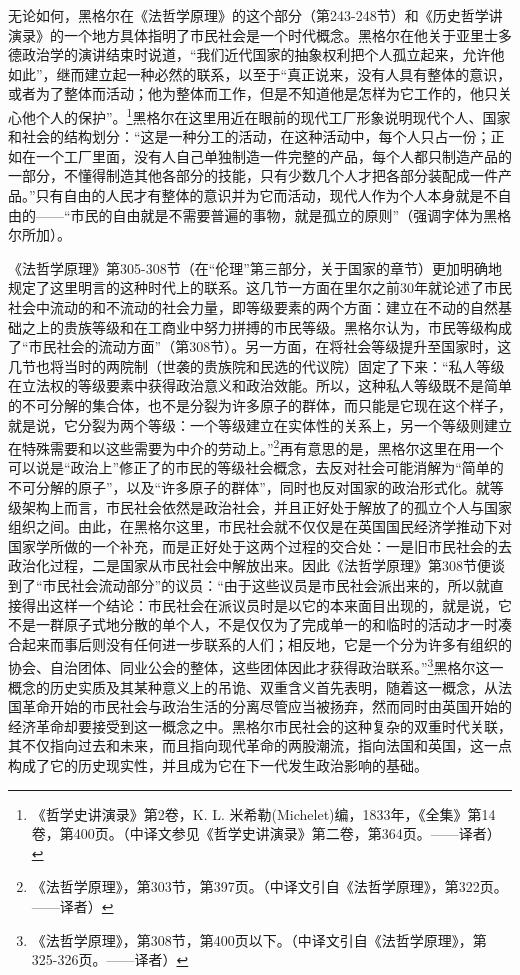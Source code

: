 无论如何，黑格尔在《法哲学原理》的这个部分（第243-248节）和《历史哲学讲演录》的一个地方具体指明了市民社会是一个时代概念。黑格尔在他关于亚里士多德政治学的演讲结束时说道，“我们近代国家的抽象权利把个人孤立起来，允许他如此”，继而建立起一种必然的联系，以至于“真正说来，没有人具有整体的意识，或者为了整体而活动；他为整体而工作，但是不知道他是怎样为它工作的，他只关心他个人的保护”。\footnote{《哲学史讲演录》第2卷，K. L. 米希勒(Michelet)编，1833年，《全集》第14卷，第400页。（中译文参见《哲学史讲演录》第二卷，第364页。——译者）}黑格尔在这里用近在眼前的现代工厂形象说明现代个人、国家和社会的结构划分：“这是一种分工的活动，在这种活动中，每个人只占一份；正如在一个工厂里面，没有人自己单独制造一件完整的产品，每个人都只制造产品的一部分，不懂得制造其他各部分的技能，只有少数几个人才把各部分装配成一件产品。”只有自由的人民才有整体的意识并为它而活动，现代人作为个人本身就是不自由的——“市民的自由就是不需要普遍的事物，就是孤立的原则”（强调字体为黑格尔所加）。

《法哲学原理》第305-308节（在“伦理”第三部分，关于国家的章节）更加明确地规定了这里明言的这种时代上的联系。这几节一方面在里尔之前30年就论述了市民社会中流动的和不流动的社会力量，即等级要素的两个方面：建立在不动的自然基础之上的贵族等级和在工商业中努力拼搏的市民等级。黑格尔认为，市民等级构成了“市民社会的流动方面”（第308节）。另一方面，在将社会等级提升至国家时，这几节也将当时的两院制（世袭的贵族院和民选的代议院）固定了下来：“私人等级在立法权的等级要素中获得政治意义和政治效能。所以，这种私人等级既不是简单的不可分解的集合体，也不是分裂为许多原子的群体，而只能是它现在这个样子，就是说，它分裂为两个等级：一个等级建立在实体性的关系上，另一个等级则建立在特殊需要和以这些需要为中介的劳动上。”\footnote{《法哲学原理》，第303节，第397页。（中译文引自《法哲学原理》，第322页。——译者）}再有意思的是，黑格尔这里在用一个可以说是“政治上”修正了的市民的等级社会概念，去反对社会可能消解为“简单的不可分解的原子”，以及“许多原子的群体”，同时也反对国家的政治形式化。就等级架构上而言，市民社会依然是政治社会，并且正好处于解放了的孤立个人与国家组织之间。由此，在黑格尔这里，市民社会就不仅仅是在英国国民经济学推动下对国家学所做的一个补充，而是正好处于这两个过程的交合处：一是旧市民社会的去政治化过程，二是国家从市民社会中解放出来。因此《法哲学原理》第308节便谈到了“市民社会流动部分”的议员：“由于这些议员是市民社会派出来的，所以就直接得出这样一个结论：市民社会在派议员时是以它的本来面目出现的，就是说，它不是一群原子式地分散的单个人，不是仅仅为了完成单一的和临时的活动才一时凑合起来而事后则没有任何进一步联系的人们；相反地，它是一个分为许多有组织的协会、自治团体、同业公会的整体，这些团体因此才获得政治联系。”\footnote{《法哲学原理》，第308节，第400页以下。（中译文引自《法哲学原理》，第325-326页。——译者）}黑格尔这一概念的历史实质及其某种意义上的吊诡、双重含义首先表明，随着这一概念，从法国革命开始的市民社会与政治生活的分离尽管应当被扬弃，然而同时由英国开始的经济革命却要接受到这一概念之中。黑格尔市民社会的这种复杂的双重时代关联，其不仅指向过去和未来，而且指向现代革命的两股潮流，指向法国和英国，这一点构成了它的历史现实性，并且成为它在下一代发生政治影响的基础。

